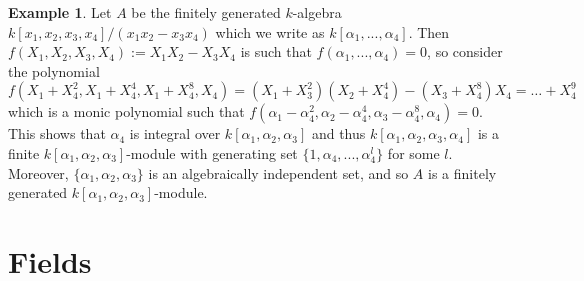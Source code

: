 \documentclass[12pt]{article}
\theoremstyle{plain}
\theoremstyle{definition}
\newtheorem{example}[thm]{Example}
\begin{document}
\begin{example}
Let $A$ be the finitely generated $k$-algebra $k[x_1,x_2,x_3,x_4]/(x_1x_2 - x_3x_4)$ which we write as $k[\alpha_1,...,\alpha_4]$. Then $f(X_1,X_2,X_3,X_4) := X_1X_2 - X_3X_4$ is such that $f(\alpha_1,...,\alpha_4) = 0$, so consider the polynomial
\[f(X_1 + X_4^2,X_1 + X_4^{4}, X_1 + X_4^8, X_4) = (X_1 + X_3^2)(X_2 + X_4^4) - (X_3 + X_4^8)X_4 = \hdots + X_4^9\]
which is a monic polynomial such that $f(\alpha_1 - \alpha_4^2, \alpha_2 - \alpha_4^4, \alpha_3 - \alpha_4^8, \alpha_4) = 0$. This shows that $\alpha_4$ is integral over $k[\alpha_1,\alpha_2,\alpha_3]$ and thus $k[\alpha_1,\alpha_2,\alpha_3,\alpha_4]$ is a finite $k[\alpha_1,\alpha_2,\alpha_3]$-module with generating set $\lbrace 1, \alpha_4,...,\alpha_4^l\rbrace$ for some $l$. Moreover, $\lbrace \alpha_1,\alpha_2,\alpha_3\rbrace$ is an algebraically independent set, and so $A$ is a finitely generated $k[\alpha_1,\alpha_2,\alpha_3]$-module.
\end{example}
%
\section{Fields}
\end{document}
